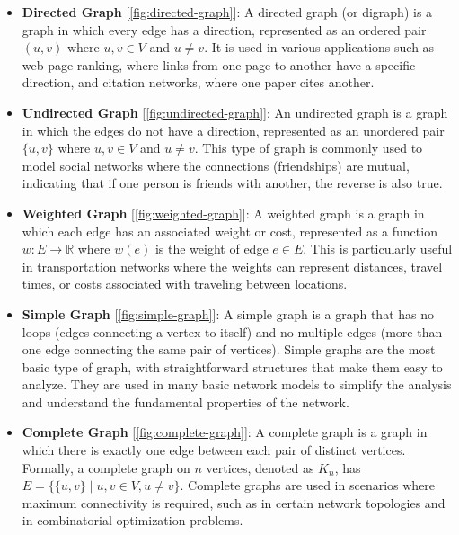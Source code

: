 \documentclass[../Thesis.tex]{subfiles}
\begin{document}
	\begin{itemize}
		\item \textbf{Directed Graph} [\autoref{fig:directed-graph}]: A directed graph (or digraph) is a graph in which every edge has a direction, represented as an ordered pair \( (u, v) \) where \( u, v \in V \) and \( u \neq v \). It is used in various applications such as web page ranking, where links from one page to another have a specific direction, and citation networks, where one paper cites another.
		
		
		\item \textbf{Undirected Graph} [\autoref{fig:undirected-graph}]: An undirected graph is a graph in which the edges do not have a direction, represented as an unordered pair \( \{u, v\} \) where \( u, v \in V \) and \( u \neq v \). This type of graph is commonly used to model social networks where the connections (friendships) are mutual, indicating that if one person is friends with another, the reverse is also true.
		
		
		\item \textbf{Weighted Graph} [\autoref{fig:weighted-graph}]: A weighted graph is a graph in which each edge has an associated weight or cost, represented as a function \( w: E \to \mathbb{R} \) where \( w(e) \) is the weight of edge \( e \in E \). This is particularly useful in transportation networks where the weights can represent distances, travel times, or costs associated with traveling between locations.
		
		
		\item \textbf{Simple Graph} [\autoref{fig:simple-graph}]: A simple graph is a graph that has no loops (edges connecting a vertex to itself) and no multiple edges (more than one edge connecting the same pair of vertices). Simple graphs are the most basic type of graph, with straightforward structures that make them easy to analyze. They are used in many basic network models to simplify the analysis and understand the fundamental properties of the network.
		
		
		\item \textbf{Complete Graph} [\autoref{fig:complete-graph}]: A complete graph is a graph in which there is exactly one edge between each pair of distinct vertices. Formally, a complete graph on \( n \) vertices, denoted as \( K_n \), has \( E = \{ \{u, v\} \mid u, v \in V, u \neq v \} \). Complete graphs are used in scenarios where maximum connectivity is required, such as in certain network topologies and in combinatorial optimization problems.
		
		

\end{itemize}
\end{document}
